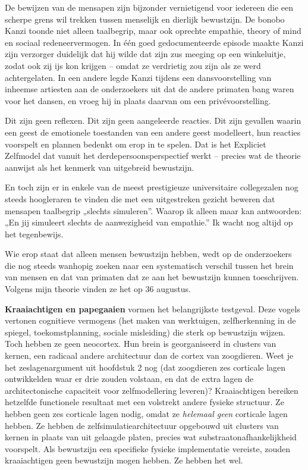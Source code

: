 \documentclass[11pt, twoside, openright]{book}
\begin{document}
De bewijzen van de mensapen zijn bijzonder vernietigend voor iedereen die een scherpe grens wil trekken tussen menselijk en dierlijk bewustzijn. De bonobo Kanzi toonde niet alleen taalbegrip, maar ook oprechte empathie, theory of mind en sociaal redeneervermogen. In één goed gedocumenteerde episode maakte Kanzi zijn verzorger duidelijk dat hij wilde dat zijn zus meeging op een winkeluitje, zodat ook zij ijs kon krijgen -- omdat ze verdrietig zou zijn als ze werd achtergelaten. In een andere legde Kanzi tijdens een dansvoorstelling van inheemse artiesten aan de onderzoekers uit dat de andere primaten bang waren voor het dansen, en vroeg hij in plaats daarvan om een privévoorstelling.

Dit zijn geen reflexen. Dit zijn geen aangeleerde reacties. Dit zijn gevallen waarin een geest de emotionele toestanden van een andere geest modelleert, hun reacties voorspelt en plannen bedenkt om erop in te spelen. Dat is het Expliciet Zelfmodel dat vanuit het derdepersoonsperspectief werkt -- precies wat de theorie aanwijst als het kenmerk van uitgebreid bewustzijn.

En toch zijn er in enkele van de meest prestigieuze universitaire collegezalen nog steeds hoogleraren te vinden die met een uitgestreken gezicht beweren dat mensapen taalbegrip „slechts simuleren”. Waarop ik alleen maar kan antwoorden: „En jij simuleert slechts de aanwezigheid van empathie.” Ik wacht nog altijd op het tegenbewijs.

Wie erop staat dat alleen mensen bewustzijn hebben, wedt op de onderzoekers die nog steeds wanhopig zoeken naar een systematisch verschil tussen het brein van mensen en dat van primaten dat ze aan het bewustzijn kunnen toeschrijven. Volgens mijn theorie vinden ze het op 36 augustus.

\textbf{Kraaiachtigen en papegaaien} vormen het belangrijkste testgeval. Deze vogels vertonen cognitieve vermogens (het maken van werktuigen, zelfherkenning in de spiegel, toekomstplanning, sociale misleiding) die sterk op bewustzijn wijzen. Toch hebben ze geen neocortex. Hun brein is georganiseerd in clusters van kernen, een radicaal andere architectuur dan de cortex van zoogdieren. Weet je het zeslagenargument uit hoofdstuk 2 nog (dat zoogdieren zes corticale lagen ontwikkelden waar er drie zouden volstaan, en dat de extra lagen de architectonische capaciteit voor zelfmodellering leveren)? Kraaiachtigen bereiken hetzelfde functionele resultaat met een volstrekt andere fysieke structuur. Ze hebben geen zes corticale lagen nodig, omdat ze \textit{helemaal geen} corticale lagen hebben. Ze hebben de zelfsimulatiearchitectuur opgebouwd uit clusters van kernen in plaats van uit gelaagde platen, precies wat substraatonafhankelijkheid voorspelt. Als bewustzijn een specifieke fysieke implementatie vereiste, zouden kraaiachtigen geen bewustzijn mogen hebben. Ze hebben het wel.
\end{document}
